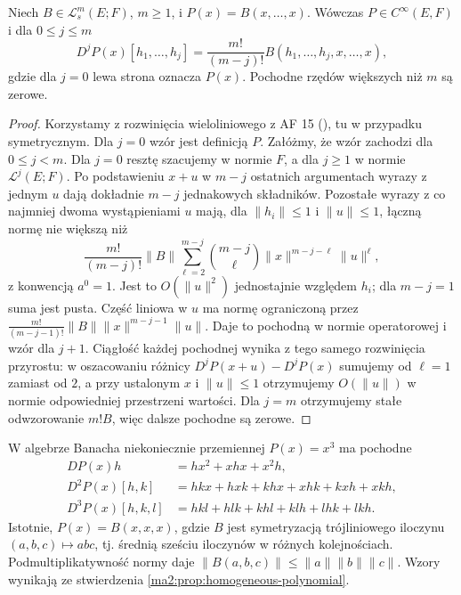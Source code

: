 \begin{stwierdzenie}
\label{ma2:prop:homogeneous-polynomial}
Niech $B\in\mathcal L_s^m(E;F)$, $m\ge1$,
i $P(x)=B(x,\ldots,x)$. Wówczas $P\in C^\infty(E,F)$
i dla $0\le j\le m$
\[
 D^jP(x)[h_1,\ldots,h_j]
 =\frac{m!}{(m-j)!}B(h_1,\ldots,h_j,x,\ldots,x),
\]
gdzie dla $j=0$ lewa strona oznacza $P(x)$.
Pochodne rzędów większych niż $m$ są zerowe.
\end{stwierdzenie}
\begin{proof}
Korzystamy z rozwinięcia wieloliniowego z AF 15
(), tu w przypadku symetrycznym.
Dla $j=0$ wzór jest definicją $P$.
Załóżmy, że wzór zachodzi dla $0\le j<m$.
Dla $j=0$ resztę szacujemy w normie $F$,
a dla $j\ge1$ w normie $\mathcal L^j(E;F)$.
Po podstawieniu $x+u$ w $m-j$ ostatnich argumentach
wyrazy z jednym $u$ dają dokładnie $m-j$ jednakowych
składników. Pozostałe wyrazy z co najmniej dwoma
wystąpieniami $u$ mają, dla $\|h_i\|\le1$ i $\|u\|\le1$,
łączną normę nie większą niż
\[
 \frac{m!}{(m-j)!}\|B\|
 \sum_{\ell=2}^{m-j}\binom{m-j}{\ell}
             \|x\|^{m-j-\ell}\|u\|^\ell ,
\]
z konwencją $a^0=1$. Jest to $O(\|u\|^2)$
jednostajnie względem $h_i$; dla $m-j=1$ suma jest pusta.
Część liniowa w $u$ ma normę ograniczoną przez
$\frac{m!}{(m-j-1)!}\|B\|\|x\|^{m-j-1}\|u\|$.
Daje to pochodną w normie operatorowej i wzór dla $j+1$.
Ciągłość każdej pochodnej wynika z tego samego
rozwinięcia przyrostu: w oszacowaniu różnicy
$D^jP(x+u)-D^jP(x)$ sumujemy od $\ell=1$ zamiast od $2$,
a przy ustalonym $x$ i $\|u\|\le1$ otrzymujemy
$O(\|u\|)$ w normie odpowiedniej przestrzeni wartości.
Dla $j=m$ otrzymujemy stałe odwzorowanie $m!B$,
więc dalsze pochodne są zerowe.
\end{proof}

\begin{przyklad}
W algebrze Banacha niekoniecznie przemiennej
$P(x)=x^3$ ma pochodne
\[
 \begin{aligned}
 DP(x)h&=hx^2+xhx+x^2h,\\
 D^2P(x)[h,k]&=hkx+hxk+khx+xhk+kxh+xkh,\\
 D^3P(x)[h,k,l]&=hkl+hlk+khl+klh+lhk+lkh.
 \end{aligned}
\]
Istotnie, $P(x)=B(x,x,x)$, gdzie
$B$ jest symetryzacją trójliniowego iloczynu
$(a,b,c)\mapsto abc$, tj. średnią sześciu iloczynów
w różnych kolejnościach. Podmultiplikatywność normy
daje $\|B(a,b,c)\|\le\|a\|\|b\|\|c\|$.
Wzory wynikają ze stwierdzenia
\ref{ma2:prop:homogeneous-polynomial}.
\end{przyklad}

